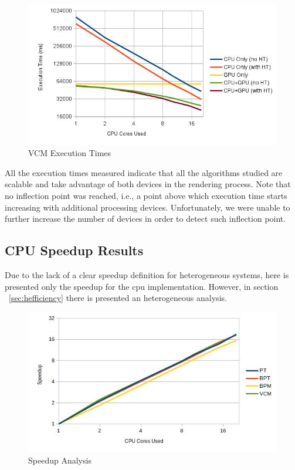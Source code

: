 \begin{figure}[H]
\centering
\includegraphics[width=0.8\linewidth]{img/vcmTexec.jpg}
\caption{\label{img:vcmTexec} VCM Execution Times}
\end{figure}

All the execution times measured indicate that all the algorithms studied are scalable and take advantage of both devices in the rendering process. Note that no inflection point was reached, i.e., a point above which execution time starts increasing with additional processing devices. Unfortunately, we were unable to further increase the number of devices in order to detect such inflection point.

\subsection{CPU Speedup Results}

Due to the lack of a clear speedup definition for heterogeneous systems, here is presented only the speedup for the \gls{cpu} implementation. However, in section ~\ref{sec:hefficiency} there is presented an heterogeneous analysis.

\begin{figure}[H]
\centering
\includegraphics[width=0.8\linewidth]{img/speedup.jpg}
\caption{\label{img:speedup} Speedup Analysis}
\end{figure}

